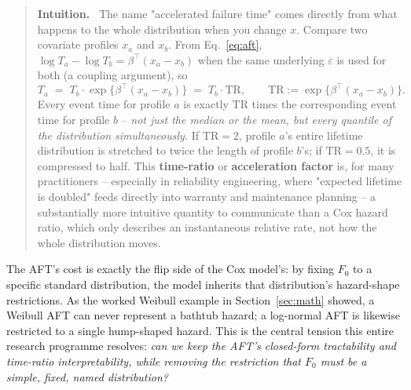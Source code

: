 \documentclass[11pt]{article}
\newcommand{\eps}{\varepsilon}
\newenvironment{intuition}
  {\par\addvspace{8pt}\begin{quote}\noindent\textbf{\textcolor{blue!40!black}{Intuition.}}\ }
  {\end{quote}\par\addvspace{8pt}}
\begin{document}
\begin{intuition}
The name "accelerated failure time" comes directly from what happens to
the whole distribution when you change $x$. Compare two covariate
profiles $x_a$ and $x_b$. From Eq.~\eqref{eq:aft}, $\log T_a - \log T_b =
\beta^\top(x_a - x_b)$ when the same underlying $\eps$ is used for both
(a coupling argument), so
\begin{equation}
  T_a \;=\; T_b \cdot \exp\{\beta^\top(x_a - x_b)\} \;=\; T_b \cdot \mathrm{TR},
  \qquad \mathrm{TR} := \exp\{\beta^\top(x_a - x_b)\}.
  \label{eq:time-ratio}
\end{equation}
Every event time for profile $a$ is exactly $\mathrm{TR}$ times the
corresponding event time for profile $b$ -- \emph{not just the median or
the mean, but every quantile of the distribution simultaneously.} If
$\mathrm{TR} = 2$, profile $a$'s entire lifetime distribution is stretched
to twice the length of profile $b$'s; if $\mathrm{TR} = 0.5$, it is
compressed to half. This \textbf{time-ratio} or \textbf{acceleration
factor} is, for many practitioners -- especially in reliability
engineering, where "expected lifetime is doubled" feeds directly into
warranty and maintenance planning -- a substantially more intuitive
quantity to communicate than a Cox hazard ratio, which only describes an
instantaneous relative rate, not how the whole distribution moves.
\end{intuition}

The AFT's cost is exactly the flip side of the Cox model's: by fixing
$F_0$ to a specific standard distribution, the model inherits that
distribution's hazard-shape restrictions. As the worked Weibull example
in Section~\ref{sec:math} showed, a Weibull AFT can never represent a
bathtub hazard; a log-normal AFT is likewise restricted to a single
hump-shaped hazard. This is the central tension this entire research
programme resolves: \emph{can we keep the AFT's closed-form tractability
and time-ratio interpretability, while removing the restriction that
$F_0$ must be a simple, fixed, named distribution?}
\end{document}
